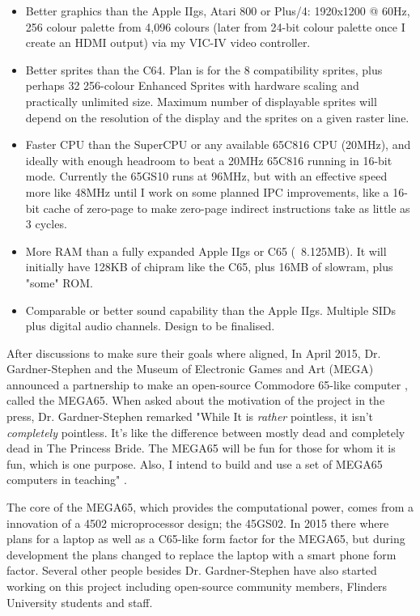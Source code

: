 \begin{itemize}[before=\itshape]
\item Better graphics than the Apple IIgs, Atari 800 or Plus/4: 1920x1200 @ 60Hz, 256 colour palette from 4,096 colours (later from 24-bit colour palette once I create an HDMI output) via my VIC-IV video controller.
 \item    Better sprites than the C64.  Plan is for the 8 compatibility sprites, plus perhaps 32 256-colour Enhanced Sprites with hardware scaling and practically unlimited size.  Maximum number of displayable sprites will depend on the resolution of the display and the sprites on a given raster line.
 \item    Faster CPU than the SuperCPU or any available 65C816 CPU (20MHz), and ideally with enough headroom to beat a 20MHz 65C816 running in 16-bit mode.  Currently the 65GS10 runs at 96MHz, but with an effective speed more like 48MHz until I work on some planned IPC improvements, like a 16-bit cache of zero-page to make zero-page indirect instructions take as little as 3 cycles.
 \item    More RAM than a fully expanded Apple IIgs or C65 (~8.125MB).  It will initially have 128KB of chipram like the C65, plus 16MB of slowram, plus "some" ROM.
 \item    Comparable or better sound capability than the Apple IIgs.  Multiple SIDs plus digital audio channels.  Design to be finalised.
 \end{itemize}  

  
After discussions to make sure their goals where aligned, In April 2015, Dr. Gardner-Stephen and the Museum of Electronic Games and Art (MEGA) announced a partnership to make an open-source Commodore 65-like computer 
\cite{RN47}, called the MEGA65. When asked about the motivation of the project in the press, Dr. Gardner-Stephen remarked "While It is \textit{rather} pointless, it isn't \textit{completely} pointless. It's like the difference between mostly dead and completely dead in The Princess Bride.  The MEGA65 will be fun for those for whom it is fun, which is one purpose.  Also, I intend to build and use a set of MEGA65 computers in teaching" 
\cite{RN48}.

The core of  the MEGA65, which provides the computational power, comes from a innovation of a 4502 microprocessor design; the 45GS02.
In 2015 there where plans for a laptop as well as a C65-like form factor for the MEGA65, but during development the plans changed to replace the laptop with a smart phone form factor. Several other people besides Dr. Gardner-Stephen have also started working on this project including open-source community members, Flinders University students and staff. 

